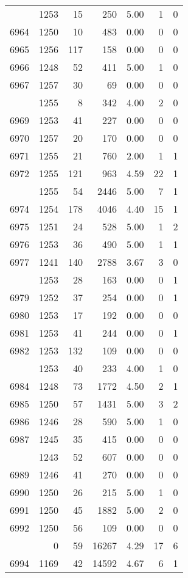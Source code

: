 \documentclass[
]{article}
\begin{document}
\begin{table}
\begin{tabular}[t]{lrrrrrr}
\addlinespace
6963 & 1253 & 15 & 250 & 5.00 & 1 & 0\\
6964 & 1250 & 10 & 483 & 0.00 & 0 & 0\\
6965 & 1256 & 117 & 158 & 0.00 & 0 & 0\\
6966 & 1248 & 52 & 411 & 5.00 & 1 & 0\\
6967 & 1257 & 30 & 69 & 0.00 & 0 & 0\\
\addlinespace
6968 & 1255 & 8 & 342 & 4.00 & 2 & 0\\
6969 & 1253 & 41 & 227 & 0.00 & 0 & 0\\
6970 & 1257 & 20 & 170 & 0.00 & 0 & 0\\
6971 & 1255 & 21 & 760 & 2.00 & 1 & 1\\
6972 & 1255 & 121 & 963 & 4.59 & 22 & 1\\
\addlinespace
6973 & 1255 & 54 & 2446 & 5.00 & 7 & 1\\
6974 & 1254 & 178 & 4046 & 4.40 & 15 & 1\\
6975 & 1251 & 24 & 528 & 5.00 & 1 & 2\\
6976 & 1253 & 36 & 490 & 5.00 & 1 & 1\\
6977 & 1241 & 140 & 2788 & 3.67 & 3 & 0\\
\addlinespace
6978 & 1253 & 28 & 163 & 0.00 & 0 & 1\\
6979 & 1252 & 37 & 254 & 0.00 & 0 & 1\\
6980 & 1253 & 17 & 192 & 0.00 & 0 & 0\\
6981 & 1253 & 41 & 244 & 0.00 & 0 & 1\\
6982 & 1253 & 132 & 109 & 0.00 & 0 & 0\\
\addlinespace
6983 & 1253 & 40 & 233 & 4.00 & 1 & 0\\
6984 & 1248 & 73 & 1772 & 4.50 & 2 & 1\\
6985 & 1250 & 57 & 1431 & 5.00 & 3 & 2\\
6986 & 1246 & 28 & 590 & 5.00 & 1 & 0\\
6987 & 1245 & 35 & 415 & 0.00 & 0 & 0\\
\addlinespace
6988 & 1243 & 52 & 607 & 0.00 & 0 & 0\\
6989 & 1246 & 41 & 270 & 0.00 & 0 & 0\\
6990 & 1250 & 26 & 215 & 5.00 & 1 & 0\\
6991 & 1250 & 45 & 1882 & 5.00 & 2 & 0\\
6992 & 1250 & 56 & 109 & 0.00 & 0 & 0\\
\addlinespace
6993 & 0 & 59 & 16267 & 4.29 & 17 & 6\\
6994 & 1169 & 42 & 14592 & 4.67 & 6 & 1\\

\end{tabular}
\end{table}
\end{document}
